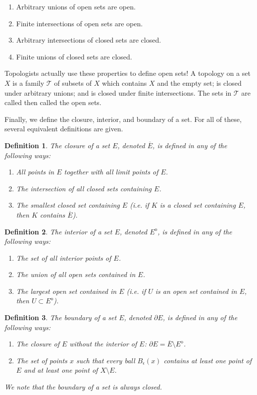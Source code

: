 \documentclass[12pt]{amsart}         %
\newtheorem{definition}{Definition}[section]
\theoremstyle{remark}
\begin{document}
\begin{enumerate}
    \item Arbitrary unions of open sets are open.
    \item Finite intersections of open sets are open.
    \item Arbitrary intersections of closed sets are closed.
    \item Finite unions of closed sets are closed.
\end{enumerate}

Topologists actually use these properties to define open sets! A topology on a set $X$ is a family $\mathcal{T}$ of subsets of $X$ which contains $X$ and the empty set; is closed under arbitrary unions; and is closed under finite intersections. The sets in $\mathcal{T}$ are called then called the open sets. 

Finally, we define the closure, interior, and boundary of a set. For all of these, several equivalent definitions are given.

\begin{definition}
The \emph{closure} of a set $E$, denoted $\overline{E}$, is defined in any of the following ways:
\begin{enumerate}
    \item All points in $E$ together with all limit points of $E$.
    \item The intersection of all closed sets containing $E$.
    \item The smallest closed set containing $E$ (i.e. if $K$ is a closed set containing $E$, then $K$ contains $\overline{E}$).
\end{enumerate}
\end{definition}

\begin{definition}
The \emph{interior} of a set $E$, denoted $E^\mathrm{o}$, is defined in any of the following ways:
\begin{enumerate}
    \item The set of all interior points of $E$.
    \item The union of all open sets contained in $E$.
    \item The largest open set contained in $E$ (i.e. if $U$ is an open set contained in $E$, then $U \subset E^\mathrm{o}$).
\end{enumerate}
\end{definition}

\begin{definition}
The \emph{boundary} of a set $E$, denoted $\partial E$, is defined in any of the following ways:
\begin{enumerate}
\item The closure of $E$ without the interior of $E$: $\partial E = \overline{E}\setminus E^\mathrm{o}$.
\item The set of points $x$ such that every ball $B_{\epsilon}(x)$ contains at least one point of $E$ and at least one point of $X\setminus E$.
\end{enumerate}

We note that the boundary of a set is always closed.

\end{definition}
\end{document}
